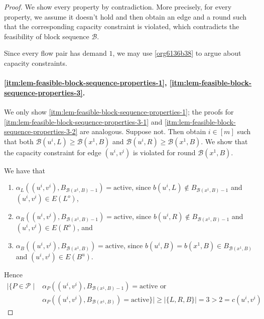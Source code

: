 \documentclass[fontsize=11pt,paper=a4]{book}
\begin{document}
\begin{proof}
We show every property by contradiction.
More precisely, for every property, we assume it doesn't hold and then obtain an edge and a round such that the corresponding capacity constraint is violated, which contradicts the feasibility of block sequence \(\mathcal{B}\).

Since every flow pair has demand \(1\), we may use \ref{org6136b38} to argue about capacity constraints.

\paragraph{\ref{itm:lem-feasible-block-sequence-properties-1}, \ref{itm:lem-feasible-block-sequence-properties-3}.}
We only show \ref{itm:lem-feasible-block-sequence-properties-1}; the proofs for \ref{itm:lem-feasible-block-sequence-properties-3-1} and \ref{itm:lem-feasible-block-sequence-properties-3-2} are analogous.
Suppose not.
Then obtain \(i\in[m]\) such that both \(\mathcal{B}(u^i,L)\geq\mathcal{B}(x^1,B)\) and \(\mathcal{B}(u^i,R)\geq\mathcal{B}(x^1,B)\).
We show that the capacity constraint for edge \((u^i,v^i)\) is violated for round \(\mathcal{B}(x^1,B)\).

We have that

\begin{enumerate}
\item \(\alpha_L((u^i,v^i),B_{\mathcal{B}(x^1,B)-1})=\mathrm{active}\), since \(b(u^i,L)\notin B_{\mathcal{B}(x^1,B)-1}\) and \((u^i,v^i)\in E(L^o)\),

\item \(\alpha_R((u^i,v^i),B_{\mathcal{B}(x^1,B)-1})=\mathrm{active}\), since \(b(u^i,R)\notin B_{\mathcal{B}(x^1,B)-1}\) and \((u^i,v^i)\in E(R^o)\), and

\item \(\alpha_B((u^i,v^i),B_{\mathcal{B}(x^1,B)})=\mathrm{active}\), since \(b(u^i,B)=b(x^1,B)\in B_{\mathcal{B}(x^1,B)}\) and \((u^i,v^i)\in E(B^u)\).
\end{enumerate}

Hence
\begin{align*}
\lvert\{P\in\mathcal{P}\mid&\alpha_P((u^i,v^i),B_{\mathcal{B}(x^1,B)-1})=\mathrm{active}\text{ or }\\
&\alpha_P((u^i,v^i),B_{\mathcal{B}(x^1,B)})=\mathrm{active}\}\rvert\geq\lvert\{L,R,B\}\rvert=3>2=c(u^i,v^i)
\end{align*}


\end{proof}
\end{document}
